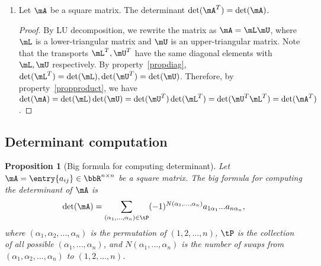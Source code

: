 \documentclass[11pt]{article}
\theoremstyle{plain}
\newtheorem{prop}{Proposition}
\theoremstyle{definition}
\begin{document}
\begin{enumerate}
	\item\label{proptrans} Let $\mA$ be a square matrix. The determinant $\det(\mA^T) = \det(\mA)$. 
	
	\begin{proof}
		By LU decomposition, we rewrite the matrix as $\mA = \mL \mU$, where $\mL$ is a lower-triangular matrix and $\mU$ is an upper-triangular matrix. Note that the transports $\mL^T,\mU^T$ have the same diagonal elements with $\mL, \mU$ respectively. By property~\ref{propdiag}, $\det(\mL^T)= \det(\mL),  \det(\mU^T) = \det(\mU)$. Therefore, by property~\ref{propproduct}, we have  $\det(\mA) = \det(\mL) \det(\mU) = \det(\mU^T) \det(\mL^T) = \det(\mU^T \mL^T) = \det(\mA^T)$. 
			\end{proof}
\end{enumerate}

\subsection{Determinant computation}
\begin{prop}[Big formula for computing determinant]
	Let  $\mA = \entry{a_{ij}} \in \bbR^{n \times n}$ be a square matrix. The big formula for computing the determinant of $\mA$ is
	\[ \det(\mA) =  \sum_{(\alpha_1,...,\alpha_n) \in \tP} (-1)^{N(\alpha_1,...,\alpha_n)} a_{1\alpha_1} ... a_{n \alpha_n},  \]
	where $(\alpha_1, \alpha_2, ...,\alpha_n)$ is the permutation of $(1,2,...,n)$, $\tP$ is the collection of all possible  $(\alpha_1,...,\alpha_n)$, and $N(\alpha_1,...,\alpha_n)$ is the number of swaps from $(\alpha_1,\alpha_2,...,\alpha_n)$  to $(1,2,...,n)$. 
\end{prop}
\end{document}
